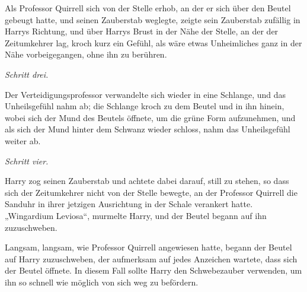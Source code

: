 Als Professor Quirrell sich von der Stelle erhob, an der er sich über den Beutel gebeugt hatte, und seinen Zauberstab weglegte, zeigte sein Zauberstab zufällig in Harrys Richtung, und über Harrys Brust in der Nähe der Stelle, an der der Zeitumkehrer lag, kroch kurz ein Gefühl, als wäre etwas Unheimliches ganz in der Nähe vorbeigegangen, ohne ihn zu berühren.

\emph{Schritt drei.}

Der Verteidigungsprofessor verwandelte sich wieder in eine Schlange, und das Unheilsgefühl nahm ab; die Schlange kroch zu dem Beutel und in ihn hinein, wobei sich der Mund des Beutels öffnete, um die grüne Form aufzunehmen, und als sich der Mund hinter dem Schwanz wieder schloss, nahm das Unheilsgefühl weiter ab.

\emph{Schritt vier.}

Harry zog seinen Zauberstab und achtete dabei darauf, still zu stehen, so dass sich der Zeitumkehrer nicht von der Stelle bewegte, an der Professor Quirrell die Sanduhr in ihrer jetzigen Ausrichtung in der Schale verankert hatte. „Wingardium Leviosa“, murmelte Harry, und der Beutel begann auf ihn zuzuschweben.

Langsam, langsam, wie Professor Quirrell angewiesen hatte, begann der Beutel auf Harry zuzuschweben, der aufmerksam auf jedes Anzeichen wartete, dass sich der Beutel öffnete. In diesem Fall sollte Harry den Schwebezauber verwenden, um ihn so schnell wie möglich von sich weg zu befördern.

